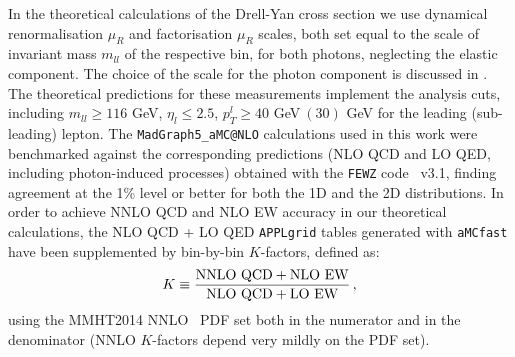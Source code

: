 In the theoretical calculations of the Drell-Yan cross section we use
dynamical renormalisation $\mu_{R}$ and factorisation $\mu_{R}$
scales, both set equal to the scale of invariant mass $m_{ll}$ 
of the respective bin, for both photons, neglecting the elastic component.
%
The choice of the scale for the photon component is discussed in 
\cite{Dittmaier:2009cr}.
%
The theoretical predictions for these measurements implement the
analysis cuts, including $m_{ll}\ge 116$ GeV, $\eta_l\le 2.5$,
$p_T^l \ge 40$ GeV$~(30)$ GeV for the leading (sub-leading) lepton.
%
The {\tt MadGraph5{\_}aMC@NLO} calculations used in this work were
benchmarked against the corresponding predictions (NLO QCD and LO QED,
including photon-induced processes) obtained with the {\tt FEWZ}
code~\cite{Gavin:2012sy} v3.1, finding agreement at the 1\% level or
better for both the 1D and the 2D distributions.
%
In order to achieve NNLO QCD and NLO EW accuracy in our theoretical
calculations, the NLO QCD + LO QED {\tt APPLgrid} tables generated
with {\tt aMCfast} have been supplemented by bin-by-bin $K$-factors,
defined as:
\begin{equation}
  \label{eq:kfactor}
  K \equiv\frac{\rm NNLO\  QCD  + NLO\  EW}{\rm NLO\  QCD + LO\  EW} \, ,
\end{equation}
using the MMHT2014 NNLO~\cite{Harland-Lang:2014zoa} PDF set both in
the numerator and in the denominator (NNLO $K$-factors depend very
mildly on the PDF set).
